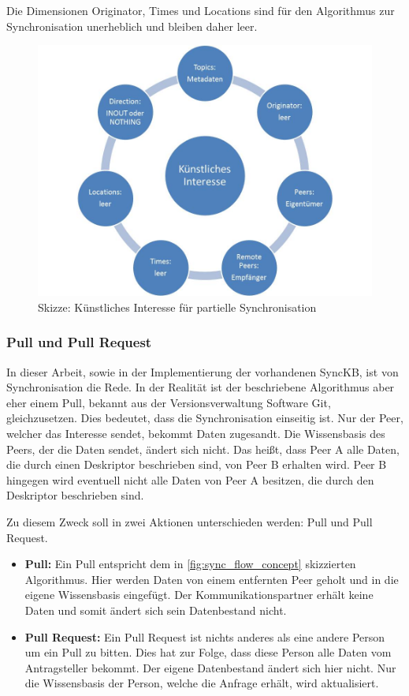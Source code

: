 \documentclass[a4paper]{article}
\begin{document}
	Die Dimensionen Originator, Times und Locations sind für den
	Algorithmus zur	Synchronisation unerheblich und bleiben daher leer.
	
	\begin{figure}[H]
		\includegraphics[width=\linewidth]{../Bilder/artificial_context.jpg}
		\caption{Skizze: Künstliches Interesse für partielle Synchronisation}
		\label{fig:artificial_context}
	\end{figure}
	
	\subsubsection{Pull und Pull Request}
	\label{sec:pull}
	
	In dieser Arbeit, sowie in der Implementierung der vorhandenen SyncKB, ist
	von Synchronisation die Rede. In der Realität ist der beschriebene 
	Algorithmus aber eher einem Pull, bekannt aus der Versionsverwaltung
	Software Git, gleichzusetzen. Dies bedeutet, dass die Synchronisation
	einseitig ist. Nur der Peer, welcher das Interesse sendet, bekommt Daten
	zugesandt. Die Wissensbasis des Peers, der die Daten sendet, ändert sich nicht.
	Das heißt, dass Peer A alle Daten, die durch einen Deskriptor beschrieben sind,
	von Peer B erhalten wird. Peer B hingegen wird eventuell nicht alle Daten von
	Peer A besitzen, die durch den Deskriptor beschrieben sind.
	
	Zu diesem Zweck soll in zwei Aktionen unterschieden werden: 
	Pull und Pull Request.
	
	\begin{itemize}
		\item \textbf{Pull:} Ein Pull entspricht dem in
		\autoref{fig:sync_flow_concept} skizzierten Algorithmus. Hier werden
		Daten von einem entfernten Peer geholt und in die eigene Wissensbasis
		eingefügt. Der Kommunikationspartner erhält keine Daten und somit ändert
		sich sein Datenbestand nicht.
		\item \textbf{Pull Request:} Ein Pull Request ist nichts anderes als eine
		andere Person um ein Pull zu bitten. Dies hat zur Folge, dass diese
		Person alle Daten vom Antragsteller bekommt. Der eigene Datenbestand 
		ändert sich hier nicht. Nur die Wissensbasis der Person, welche die
		Anfrage erhält, wird aktualisiert.	
	\end{itemize} 
	
\end{document}
